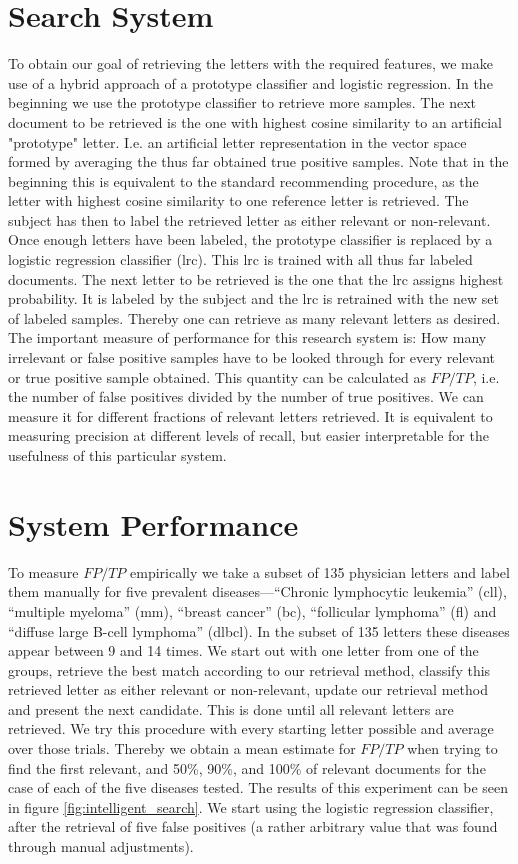 \section{Search System}
To obtain our goal of retrieving the letters with the required features, we make use of a hybrid approach of a prototype classifier and logistic regression. In the beginning we use the prototype classifier to retrieve more samples. The next document to be retrieved is the one with highest cosine similarity to an artificial "prototype" letter. I.e. an artificial letter representation in the vector space formed by averaging the thus far obtained true positive samples. Note that in the beginning this is equivalent to the standard recommending procedure, as the letter with highest cosine similarity to one reference letter is retrieved. The subject has then to label the retrieved letter as either relevant or non-relevant. Once enough letters have been labeled, the prototype classifier is replaced by a logistic regression classifier (lrc). This lrc is trained with all thus far labeled documents. The next letter to be retrieved is the one that the lrc assigns highest probability. It is labeled by the subject and the lrc is retrained with the new set of labeled samples. Thereby one can retrieve as many relevant letters as desired. The important measure of performance for this research system is: How many irrelevant or false positive samples have to be looked through for every relevant or true positive sample obtained. This quantity can be calculated as $FP/TP$, i.e. the number of false positives divided by the number of true positives. We can measure it for different fractions of relevant letters retrieved. It is equivalent to measuring precision at different levels of recall, but easier interpretable for the usefulness of this particular system.

\section{System Performance}
To measure $FP/TP$ empirically we take a subset of 135 physician letters and label them manually for five prevalent diseases---``Chronic lymphocytic leukemia'' (cll), ``multiple myeloma'' (mm), ``breast cancer'' (bc), ``follicular lymphoma'' (fl) and ``diffuse large B-cell lymphoma'' (dlbcl). In the subset of 135 letters these diseases appear between 9 and 14 times. We start out with one letter from one of the groups, retrieve the best match according to our retrieval method, classify this retrieved letter as either relevant or non-relevant, update our retrieval method and present the next candidate. This is done until all relevant letters are retrieved. We try this procedure with every starting letter possible and average over those trials. Thereby we obtain a mean estimate for $FP/TP$ when trying to find the first relevant, and 50\%, 90\%, and 100\% of relevant documents for the case of each of the five diseases tested. The results of this experiment can be seen in figure \ref{fig:intelligent_search}. We start using the logistic regression classifier, after the retrieval of five false positives (a rather arbitrary value that was found through manual adjustments).

